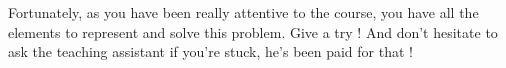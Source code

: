 \documentclass[11pt,a4paper,BCOR12mm, headexclude, footexclude, twoside, openright]{scrartcl}
\numberwithin{equation}{section} %
\numberwithin{figure}{section} %
\numberwithin{table}{section} %
\begin{document}
Fortunately, as you have been really attentive to the course, you have all the elements to represent and solve this problem. Give a try ! And don't hesitate to ask the teaching assistant if you're stuck, he's been paid for that !







\end{document}
